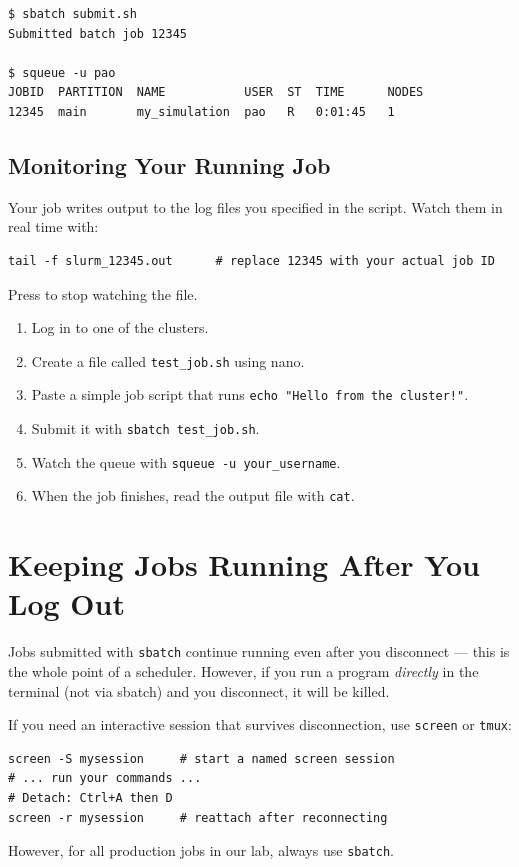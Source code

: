 \documentclass[12pt,a4paper]{article}
\newcommand{\exercise}[1]{%
  \begin{tcolorbox}[exercisestyle]
    #1
  \end{tcolorbox}
}
\newcommand{\cmd}[1]{\texttt{\textcolor{kugreen!70!black}{#1}}}
\newcommand{\key}[1]{\fbox{\small\ttfamily #1}}
\begin{document}
\begin{lstlisting}[style=terminal]
$ sbatch submit.sh
Submitted batch job 12345

$ squeue -u pao
JOBID  PARTITION  NAME           USER  ST  TIME      NODES
12345  main       my_simulation  pao   R   0:01:45   1
\end{lstlisting}

\subsection{Monitoring Your Running Job}

Your job writes output to the log files you specified in the script.
Watch them in real time with:

\begin{lstlisting}[style=bash]
tail -f slurm_12345.out      # replace 12345 with your actual job ID
\end{lstlisting}

Press \key{Ctrl+C} to stop watching the file.

\exercise{
  \begin{enumerate}[noitemsep]
    \item Log in to one of the clusters.
    \item Create a file called \texttt{test\_job.sh} using nano.
    \item Paste a simple job script that runs \texttt{echo "Hello from the cluster!"}.
    \item Submit it with \cmd{sbatch test\_job.sh}.
    \item Watch the queue with \cmd{squeue -u your\_username}.
    \item When the job finishes, read the output file with \cmd{cat}.
  \end{enumerate}
}

\section{Keeping Jobs Running After You Log Out}

Jobs submitted with \cmd{sbatch} continue running even after you disconnect ---
this is the whole point of a scheduler. However, if you run a program
\emph{directly} in the terminal (not via sbatch) and you disconnect,
it will be killed.

\begin{tcolorbox}[defstyle, title={Use screen or tmux for interactive sessions}]
  If you need an interactive session that survives disconnection, use
  \texttt{screen} or \texttt{tmux}:
\begin{lstlisting}[style=bash]
screen -S mysession     # start a named screen session
# ... run your commands ...
# Detach: Ctrl+A then D
screen -r mysession     # reattach after reconnecting
\end{lstlisting}
  However, for all production jobs in our lab, always use \texttt{sbatch}.
\end{tcolorbox}
\end{document}
